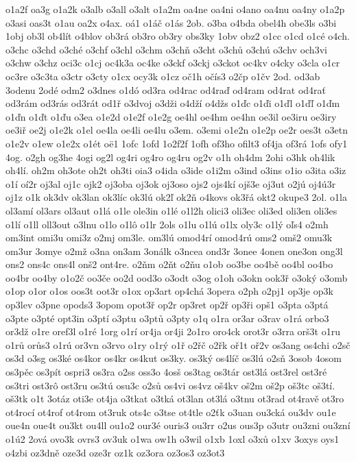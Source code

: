{o1a2f
oa3g
o1a2k
o3alb
o3all
o3alt
o1a2m
oa4ne
oa4ni
o4ano
oa4nu
oa4ny
o1a2p
o3asi
oas3t
o1au
oa2x
o4ax.
oá1
o1áč
o1ás
2ob.
o3ba
o4bda
obel4h
obe3ls
o3bi
1obj
ob3l
ob4lít
o4blov
ob3rá
ob3ro
ob3ry
obs3ky
1obv
obz2
o1cc
o1cd
o1cé
o4ch.
o3chc
o3chd
o3ché
o3chf
o3chl
o3chm
o3chň
o3cht
o3chů
o3chú
o3chv
och3vi
o3chw
o3chz
oci3c
o1cj
oc4k3a
oc4ke
o3ckf
o3ckj
o3ckot
oc4kv
o4cky
o3cla
o1cr
oc3re
o3c3ta
o3ctr
o3cty
o1cx
ocy3k
o1cz
oč1h
očís3
o2čp
o1čv
2od.
od3ab
3odenu
2odé
odm2
o3dnes
o1dó
od3ra
od4rac
od4raď
od4ram
od4rat
od4rať
od3rám
od3rás
od3rát
od1ř
o3dvoj
o3dži
o4dží
o4džs
o1ďc
o1ďi
o1ďl
o1ďľ
o1ďm
o1ďn
o1ďt
o1ďu
o3ea
o1e2d
o1e2f
o1e2g
oe4hl
oe4hm
oe4hn
oe3il
oe3iru
oe3iry
oe3iř
oe2j
o1e2k
o1el
oe4la
oe4li
oe4lu
o3em.
o3emi
o1e2n
o1e2p
oe2r
oes3t
o3etn
o1e2v
o1ew
o1e2x
o1ét
oë1
1ofc
1ofd
1o2f2f
1ofh
of3ho
ofilt3
of4ja
of3rá
1ofs
ofy1
4og.
o2gh
og3he
4ogi
og2l
og4ri
og4ro
og4ru
og2v
o1h
oh4dm
2ohi
o3hk
oh4lik
oh4lí.
oh2m
oh3ote
oh2t
oh3ti
oia3
o4ida
o3ide
o1i2m
o3ind
o3ins
o1io
o3ita
o3iz
o1í
oí2r
oj3al
oj1c
ojk2
oj3oba
oj3ok
oj3oso
ojs2
ojs4kí
ojš3e
oj3ut
o2jú
oj4ú3r
oj1z
o1k
ok3dv
ok3lan
ok3líc
ok3lú
ok2ľ
ok2ň
o4kovs
ok3řá
okt2
okupe3
2ol.
o1la
ol3amí
ol3ars
ol3aut
o1lá
o1le
ole3in
o1lé
o1l2h
olici3
oli3ec
oli3ed
oli3en
oli3es
o1lí
o1ll
oll3out
o3lnu
o1lo
o1lô
o1lr
2ols
o1lu
o1lú
o1lx
oly3c
o1lý
oľs4
o2mh
om3int
omi3u
omi3z
o2mj
om3le.
om3lú
omod4rí
omod4rú
oms2
omš2
omu3k
om3ur
3omye
o2mž
o3na
on3am
3onálk
o3ncea
ond3r
3onee
4onen
one3on
ong3l
ons2
ons4c
ons4l
onš2
ont4re.
o2ňm
o2ňt
o2ňu
o1ob
oo3be
oo4bě
oo4bl
oo4bo
oo4br
oo4by
o1o2č
oo3če
oo2d
ood3o
o3odt
o3og
o1oh
o3okn
ook3ř
o3oký
o3omb
o1op
o1or
o1os
oos3t
oot3r
o1ox
op3art
op4chá
3opera
o2ph
o2pj1
op3je
op3k
op3lev
o3pne
opods3
3opom
opot3ř
op2r
op3ret
op2ř
op3ři
opš1
o3pta
o3ptá
o3pte
o3pté
opt3in
o3ptí
o3ptu
o3ptů
o3pty
o1q
o1ra
or3ar
o3rav
o1rá
orbo3
or3dž
o1re
oref3l
o1ré
1org
o1rí
or4ja
or4ji
2o1ro
oro4ck
orot3r
o3rra
orš3t
o1ru
o1rů
orůs3
o1rú
or3vn
o3rvo
o1ry
o1rý
o1ř
o2řč
o2řk
oř1t
oř2v
os3ang
os4chi
o2sč
os3d
o3sg
os3ké
os4kor
os4kr
os4kut
os3ky.
os3ký
os4líč
os3lú
o2sň
3osob
4osom
os3pěc
os3pít
ospri3
os3ra
o2ss
oss3o
4osš
os3tag
os3tár
ost3lá
ost3rel
ost3ré
os3tri
ost3rô
ost3ru
os3tú
osu3c
o2sů
os4vi
os4vz
oš4kv
oš2m
oš2p
oš3tc
oš3tí.
oš3tk
o1t
3otáz
oti3e
ot4ja
o3tkat
o3tká
ot3lan
ot3lá
o3tnu
ot3rad
ot4ravě
ot3ro
ot4rocí
ot4rof
ot4rom
ot3ruk
ots4c
o3tse
ot4tle
o2ťk
o3uan
ou3cká
ou3dv
ou1e
oue4n
oue4t
ou3kt
ou4ll
ou1o2
our3é
ouris3
ou3rr
o2us
ous3p
o3utr
ou3zni
ou3zní
o1ú2
2ová
ovo3k
ovrs3
ov3uk
o1wa
ow1h
o3wil
o1xb
1oxl
o3xů
o1xv
3oxys
oys1
o4zbi
oz3dně
oze3d
oze3r
oz1k
oz3ora
oz3os3
oz3ot3
}
